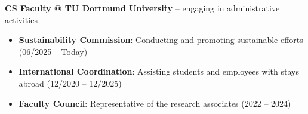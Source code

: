 \documentclass[12pt]{letter}
\begin{document}
\textbf{CS Faculty @ TU Dortmund University} -- engaging in administrative activities
{\footnotesize
\begin{itemize}[leftmargin=1.2em,noitemsep,topsep=0pt]
    \item \textbf{Sustainability Commission}: Conducting and promoting sustainable efforts (06/2025 -- Today)
    \item \textbf{International Coordination}: Assisting students and employees with stays abroad (12/2020 -- 12/2025)
    \item \textbf{Faculty Council}: Representative of the research associates (2022 -- 2024)
\end{itemize}}

\newpage

\nocite{*}
\renewcommand*{\bibfont}{\small}
\printbibliography[title={Peer-Reviewed Publications},category=peerreviewed]
\printbibliography[title={Preprints and Gray Literature},category=preprint]
\printbibliography[title={Videos \& Recorded Talks},category=videotalks]
\end{document}
